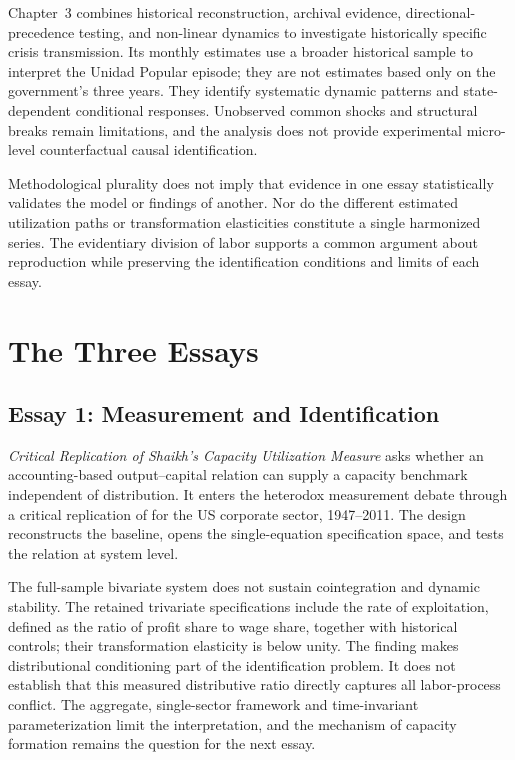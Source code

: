 Chapter~3 combines historical reconstruction, archival evidence, directional-precedence testing, and non-linear dynamics to investigate historically specific crisis transmission. Its monthly estimates use a broader historical sample to interpret the Unidad Popular episode; they are not estimates based only on the government's three years. They identify systematic dynamic patterns and state-dependent conditional responses. Unobserved common shocks and structural breaks remain limitations, and the analysis does not provide experimental micro-level counterfactual causal identification.

Methodological plurality does not imply that evidence in one essay statistically validates the model or findings of another. Nor do the different estimated utilization paths or transformation elasticities constitute a single harmonized series. The evidentiary division of labor supports a common argument about reproduction while preserving the identification conditions and limits of each essay.

\section*{The Three Essays}

\subsection*{Essay 1: Measurement and Identification}

\emph{Critical Replication of Shaikh's Capacity Utilization Measure} asks whether an accounting-based output--capital relation can supply a capacity benchmark independent of distribution. It enters the heterodox measurement debate through a critical replication of \citet{Shaikh2016} for the US corporate sector, 1947--2011. The design reconstructs the baseline, opens the single-equation specification space, and tests the relation at system level.

The full-sample bivariate system does not sustain cointegration and dynamic stability. The retained trivariate specifications include the rate of exploitation, defined as the ratio of profit share to wage share, together with historical controls; their transformation elasticity is below unity. The finding makes distributional conditioning part of the identification problem. It does not establish that this measured distributive ratio directly captures all labor-process conflict. The aggregate, single-sector framework and time-invariant parameterization limit the interpretation, and the mechanism of capacity formation remains the question for the next essay.

